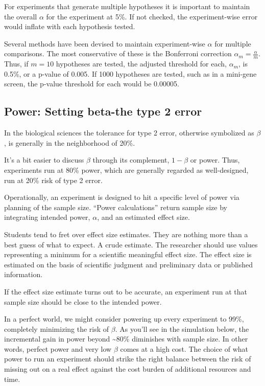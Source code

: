 \documentclass[]{book}
\begin{document}
For experiments that generate multiple hypotheses it is important to maintain the overall \(\alpha\) for the experiment at 5\%. If not checked, the experiment-wise error would inflate with each hypothesis tested.

Several methods have been devised to maintain experiment-wise \(\alpha\) for multiple comparisons. The most conservative of these is the Bonferroni correction \(\alpha_m=\frac{\alpha}{m}\). Thus, if \(m = 10\) hypotheses are tested, the adjusted threshold for each, \(\alpha_m\), is 0.5\%, or a p-value of 0.005. If 1000 hypotheses are tested, such as in a mini-gene screen, the p-value threshold for each would be 0.00005.

\hypertarget{power-setting-beta-the-type-2-error}{%
\subsection{Power: Setting beta-the type 2 error}\label{power-setting-beta-the-type-2-error}}

In the biological sciences the tolerance for type 2 error, otherwise symbolized as \(\beta\), is generally in the neighborhood of 20\%.

It's a bit easier to discuss \(\beta\) through its complement, \(1-\beta\) or power. Thus, experiments run at 80\% power, which are generally regarded as well-designed, run at 20\% risk of type 2 error.

Operationally, an experiment is designed to hit a specific level of power via planning of the sample size. ``Power calculations'' return sample size by integrating intended power, \(\alpha\), and an estimated effect size.

Students tend to fret over effect size estimates. They are nothing more than a best guess of what to expect. A crude estimate. The researcher should use values representing a minimum for a scientific meaningful effect size. The effect size is estimated on the basis of scientific judgment and preliminary data or published information.

If the effect size estimate turns out to be accurate, an experiment run at that sample size should be close to the intended power.

In a perfect world, we might consider powering up every experiment to 99\%, completely minimizing the risk of \(\beta\). As you'll see in the simulation below, the incremental gain in power beyond \textasciitilde{}80\% diminishes with sample size. In other words, perfect power and very low \(\beta\) comes at a high cost. The choice of what power to run an experiment should strike the right balance between the risk of missing out on a real effect against the cost burden of additional resources and time.
\end{document}
